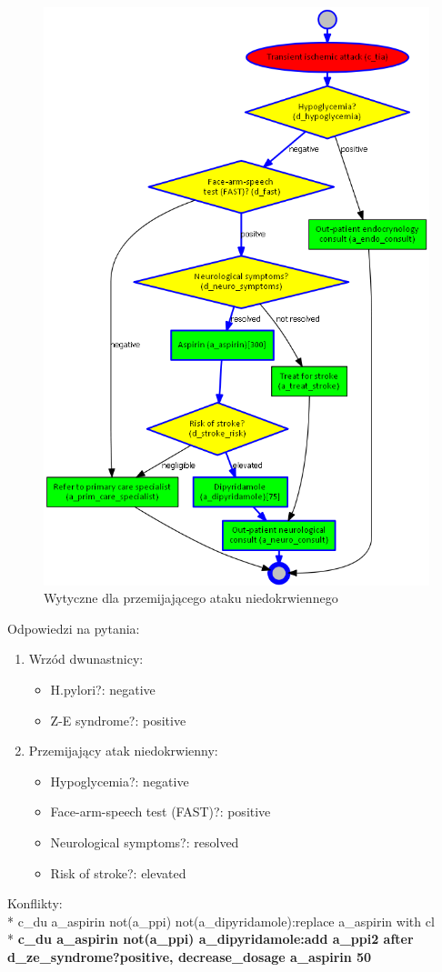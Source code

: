\begin{figure}[H]
\centering
\includegraphics[scale=0.5]{img/tia.png}
\caption{Wytyczne dla przemijającego ataku niedokrwiennego}
\label{fig:tia}
\end{figure}
\newpage
\noindent Odpowiedzi na pytania:
\begin{enumerate}
\item{Wrzód dwunastnicy:
	\begin{itemize}
	\item{H.pylori?: negative}
	\item{Z-E syndrome?: positive}
	\end{itemize}
}
\item{Przemijający atak niedokrwienny:
	\begin{itemize}
	\item{Hypoglycemia?: negative}
	\item{Face-arm-speech test (FAST)?: positive}
	\item{Neurological symptoms?: resolved}
	\item{Risk of stroke?: elevated}
	\end{itemize}
}
\end{enumerate}
Konflikty:\\*
c\_du a\_aspirin not(a\_ppi) not(a\_dipyridamole):replace a\_aspirin with cl\\*
\textbf{c\_du a\_aspirin not(a\_ppi) a\_dipyridamole:add a\_ppi2 after d\_ze\_syndrome?positive, decrease\_dosage a\_aspirin 50}

